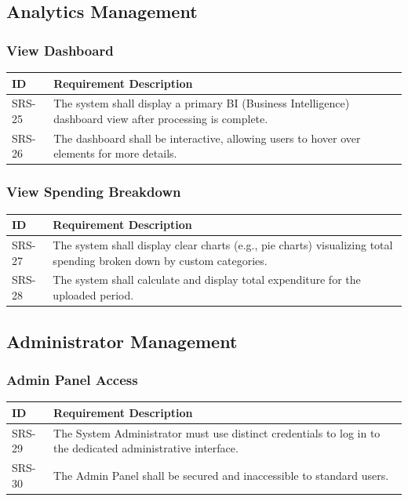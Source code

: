 \subsection{Analytics Management}

\subsubsection{View Dashboard}
\begin{longtable}{|p{2.5cm}|p{12cm}|}
	\hline
	\textbf{ID} & \textbf{Requirement Description} \\
	\hline
	SRS-25 & The system shall display a primary BI (Business Intelligence) dashboard view after processing is complete. \\ \hline
	SRS-26 & The dashboard shall be interactive, allowing users to hover over elements for more details. \\ \hline
\end{longtable}

\subsubsection{View Spending Breakdown}
\begin{longtable}{|p{2.5cm}|p{12cm}|}
	\hline
	\textbf{ID} & \textbf{Requirement Description} \\
	\hline
	SRS-27 & The system shall display clear charts (e.g., pie charts) visualizing total spending broken down by custom categories. \\ \hline
	SRS-28 & The system shall calculate and display total expenditure for the uploaded period. \\ \hline
\end{longtable}

\subsection{Administrator Management}

\subsubsection{Admin Panel Access}
\begin{longtable}{|p{2.5cm}|p{12cm}|}
	\hline
	\textbf{ID} & \textbf{Requirement Description} \\
	\hline
	SRS-29 & The System Administrator must use distinct credentials to log in to the dedicated administrative interface. \\ \hline
	SRS-30 & The Admin Panel shall be secured and inaccessible to standard users. \\ \hline
\end{longtable}

